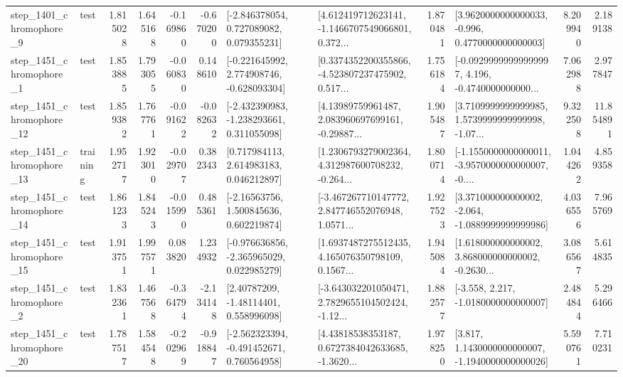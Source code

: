 \begin{tabular}{llrrrrllrlrr}
  step\_1401\_chromophore\_9 &      test &      1.815028 &    1.645168 &     -0.169860 & -0.670200 &    [-2.846378054, 0.727089082, 0.079355231] &  [4.612419712623141, -1.1466707549066801, 0.372... &       1.870481 &   [3.9620000000000033, -0.996, 0.4770000000000003] &            8.209940 &          2.189138 \\
  step\_1451\_chromophore\_1 &      test &      1.853885 &    1.793055 &     -0.060830 &  0.148610 &   [-0.221645992, 2.774908746, -0.628093304] &  [0.3374352200355866, -4.523807237475902, 0.517... &       1.756184 &  [-0.09299999999999997, 4.196, -0.4740000000000... &            7.062988 &          2.977847 \\
 step\_1451\_chromophore\_12 &      test &      1.859382 &    1.767761 &     -0.091622 & -0.082632 &   [-2.432390983, -1.238293661, 0.311055098] &  [4.13989759961487, 2.083960697699161, -0.29887... &       1.905487 &  [3.7109999999999985, 1.5739999999999998, -1.07... &            9.322508 &         11.854891 \\
 step\_1451\_chromophore\_13 &  training &      1.952717 &    1.923010 &     -0.029707 &  0.382343 &     [0.717984113, 2.614983183, 0.046212897] &  [1.2306793279002364, 4.312987600708232, -0.264... &       1.800714 &  [-1.1550000000000011, -3.9570000000000007, -0.... &            1.044262 &          4.859358 \\
 step\_1451\_chromophore\_14 &      test &      1.861233 &    1.845243 &     -0.015990 &  0.485361 &     [-2.16563756, 1.500845636, 0.602219874] &  [-3.467267710147772, 2.847746552076948, 1.0571... &       1.927523 &   [3.371000000000002, -2.064, -1.0889999999999986] &            4.036556 &          7.965769 \\
 step\_1451\_chromophore\_15 &      test &      1.913751 &    1.997571 &      0.083820 &  1.234932 &   [-0.976636856, -2.365965029, 0.022985279] &  [1.6937487275512435, 4.165076350798109, 0.1567... &       1.945084 &  [1.618000000000002, 3.868000000000002, -0.2630... &            3.086567 &          5.614835 \\
  step\_1451\_chromophore\_2 &      test &      1.832361 &    1.467568 &     -0.364794 & -2.134148 &      [2.40787209, -1.48114401, 0.558996098] &  [-3.643032201050471, 2.7829655104502424, -1.12... &       1.882577 &               [-3.558, 2.217, -1.0180000000000007] &            2.484844 &          5.296466 \\
 step\_1451\_chromophore\_20 &      test &      1.787517 &    1.584548 &     -0.202969 & -0.918847 &   [-2.562323394, -0.491452671, 0.760564958] &  [4.43818538353187, 0.6727384042633685, -1.3620... &       1.978250 &   [3.817, 1.1430000000000007, -1.1940000000000026] &            5.590761 &          7.710231 \\

\end{tabular}
